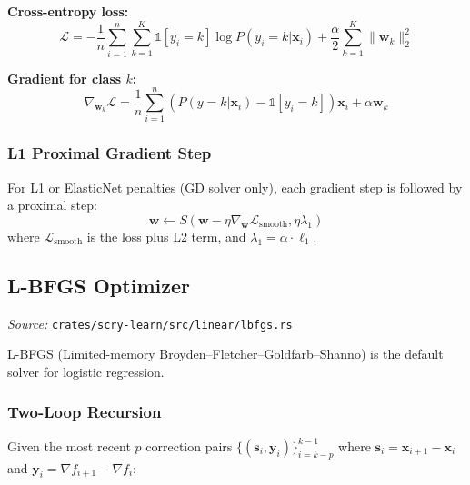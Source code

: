 \documentclass[11pt,a4paper]{article}
\theoremstyle{definition}
\theoremstyle{remark}
\begin{document}
\textbf{Cross-entropy loss:}
\begin{equation}
\mathcal{L} = -\frac{1}{n}\sum_{i=1}^n\sum_{k=1}^K \mathbb{1}[y_i = k]\log P(y_i = k|\mathbf{x}_i) + \frac{\alpha}{2}\sum_{k=1}^K\|\mathbf{w}_k\|_2^2
\end{equation}

\textbf{Gradient for class $k$:}
\begin{equation}
\nabla_{\mathbf{w}_k}\mathcal{L} = \frac{1}{n}\sum_{i=1}^n (P(y=k|\mathbf{x}_i) - \mathbb{1}[y_i = k])\mathbf{x}_i + \alpha\mathbf{w}_k
\end{equation}

\subsubsection*{L1 Proximal Gradient Step}

For L1 or ElasticNet penalties (GD solver only), each gradient step is followed by a proximal step:
\begin{equation}
\mathbf{w} \leftarrow S(\mathbf{w} - \eta\nabla_\mathbf{w}\mathcal{L}_{\text{smooth}}, \eta\lambda_1)
\end{equation}
where $\mathcal{L}_{\text{smooth}}$ is the loss plus L2 term, and $\lambda_1 = \alpha \cdot \ell_1$.

\subsection{L-BFGS Optimizer}
\label{sec:lbfgs}

\noindent\textit{Source:} \texttt{crates/scry-learn/src/linear/lbfgs.rs}

L-BFGS (Limited-memory Broyden--Fletcher--Goldfarb--Shanno) is the default solver for logistic regression.

\subsubsection*{Two-Loop Recursion}

Given the most recent $p$ correction pairs $\{(\mathbf{s}_i, \mathbf{y}_i)\}_{i=k-p}^{k-1}$ where $\mathbf{s}_i = \mathbf{x}_{i+1} - \mathbf{x}_i$ and $\mathbf{y}_i = \nabla f_{i+1} - \nabla f_i$:
\end{document}
